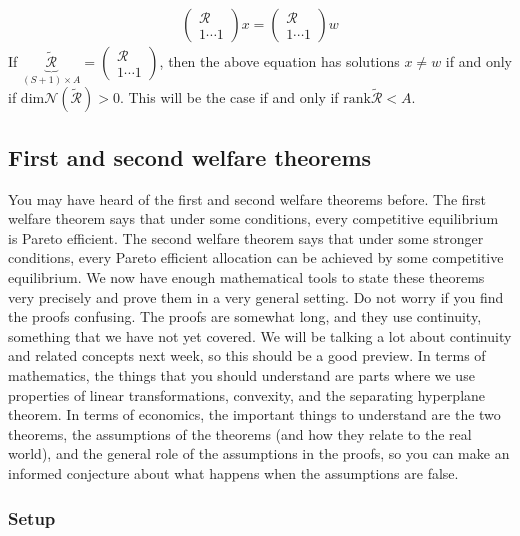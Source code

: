 \documentclass[12pt,reqno]{amsart}
\theoremstyle{definition}
\newcommand{\rank}{\mathrm{rank}}
\renewcommand{\dim}{\mathrm{dim}}
\begin{document}
\begin{align*}
  \begin{pmatrix} \mathcal{R} \\ 1 \cdots 1 \end{pmatrix} x 
  = \begin{pmatrix} \mathcal{R} \\ 1 \cdots 1 \end{pmatrix} w 
\end{align*}
If $\underbrace{\widetilde{\mathcal{R}}}_{(S+1) \times A}
=   \begin{pmatrix} \mathcal{R} \\ 1 \cdots  1 \end{pmatrix} $, then
the above equation has solutions $x \neq w$ 
if and only if $\dim \mathcal{N}(\widetilde{\mathcal{R}})> 0$. This will
be the case if and only if $\rank \widetilde{\mathcal{R}} < A$. 

\subsection{First and second welfare theorems}

You may have heard of the first and second welfare theorems
before. The first welfare theorem says that under some conditions,
every competitive equilibrium is Pareto efficient. The second welfare
theorem says that under some stronger conditions, every Pareto
efficient allocation can be achieved by some competitive
equilibrium. We now have enough mathematical tools to state these
theorems very precisely and prove them in a very general setting.  Do
not worry if you find the proofs confusing. The proofs are somewhat
long, and they use continuity, something that we have not yet
covered. We will be talking a lot about continuity and related
concepts next week, so this should be a good preview. In terms of
mathematics, the things that you should understand are parts where we
use properties of linear transformations, convexity, and the
separating hyperplane theorem. In terms of economics, the important
things to understand are the two theorems, the assumptions of the
theorems (and how they relate to the real world), and the general role
of the assumptions in the proofs, so you can make an informed
conjecture about what happens when the assumptions are false.

\subsubsection{Setup}
\end{document}

